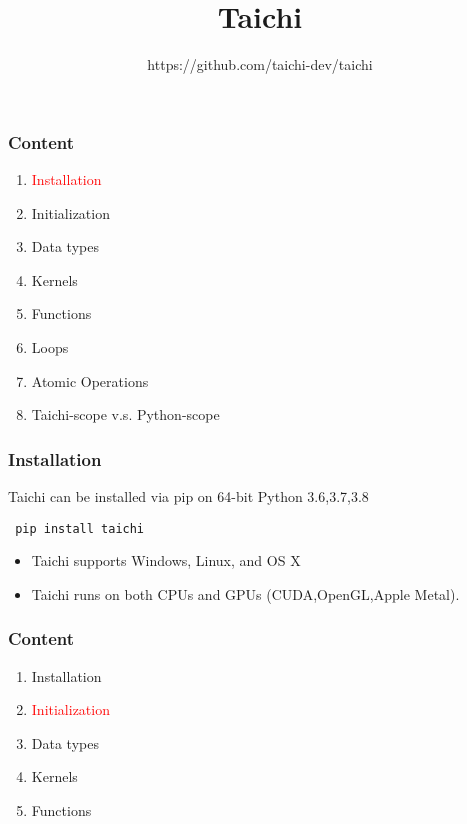 \documentclass[serif,mathserif]{beamer}
\author[frame work]{https://github.com/taichi-dev/taichi}
\title[taichi\hspace{2em}\insertframenumber/\inserttotalframenumber]{Taichi}
\begin{document}
\begin{CJK}{UTF8}{gbsn}
\maketitle


\begin{frame}
  \frametitle{Content}
  \begin{enumerate}
  \item \textcolor{red}{Installation}
  \item Initialization
  \item Data types
  \item Kernels
  \item Functions
  
  \item Loops
  \item Atomic Operations
  \item Taichi-scope v.s. Python-scope
  \end{enumerate}
\end{frame}

\begin{frame}[fragile]
  \frametitle{Installation}
  Taichi can be installed via pip on 64-bit Python 3.6,3.7,3.8
  \begin{tcolorbox}
\begin{verbatim}
 pip install taichi
\end{verbatim}
  \end{tcolorbox}

  \begin{itemize}
  \item Taichi supports Windows, Linux, and OS X
  \item Taichi runs on both CPUs and GPUs (CUDA,OpenGL,Apple Metal).
  \end{itemize}
\end{frame}

\begin{frame}
  \frametitle{Content}
  \begin{enumerate}
  \item Installation
  \item \textcolor{red}{Initialization}
  \item Data types
  \item Kernels
  \item Functions
    

\end{enumerate}
\end{frame}
\end{CJK}
\end{document}
